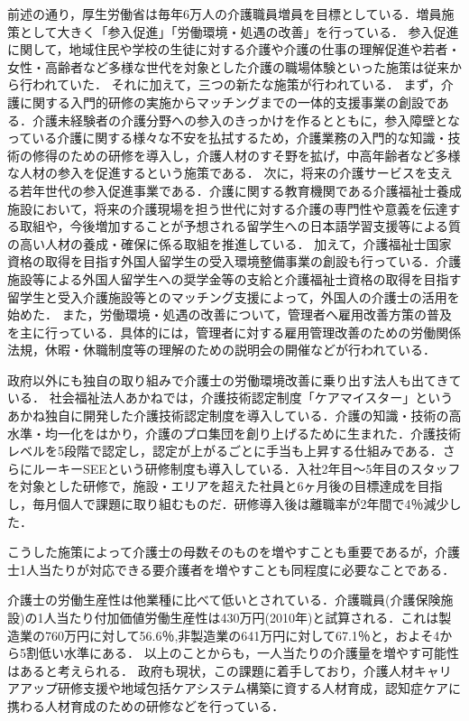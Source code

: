 前述の通り，厚生労働省は毎年6万人の介護職員増員を目標としている．増員施策として大きく「参入促進」「労働環境・処遇の改善」を行っている．
参入促進に関して，地域住民や学校の生徒に対する介護や介護の仕事の理解促進や若者・女性・高齢者など多様な世代を対象とした介護の職場体験といった施策は従来から行われていた．
それに加えて，三つの新たな施策が行われている．
まず，介護に関する入門的研修の実施からマッチングまでの一体的支援事業の創設である．介護未経験者の介護分野への参入のきっかけを作るとともに，参入障壁となっている介護に関する様々な不安を払拭するため，介護業務の入門的な知識・技術の修得のための研修を導入し，介護人材のすそ野を拡げ，中高年齢者など多様な人材の参入を促進するという施策である．
次に，将来の介護サービスを支える若年世代の参入促進事業である．介護に関する教育機関である介護福祉士養成施設において，将来の介護現場を担う世代に対する介護の専門性や意義を伝達する取組や，今後増加することが予想される留学生への日本語学習支援等による質の高い人材の養成・確保に係る取組を推進している．
加えて，介護福祉士国家資格の取得を目指す外国人留学生の受入環境整備事業の創設も行っている．介護施設等による外国人留学生への奨学金等の支給と介護福祉士資格の取得を目指す留学生と受入介護施設等とのマッチング支援によって，外国人の介護士の活用を始めた．
また，労働環境・処遇の改善について，管理者へ雇用改善方策の普及を主に行っている．具体的には，管理者に対する雇用管理改善のための労働関係法規，休暇・休職制度等の理解のための説明会の開催などが行われている．

政府以外にも独自の取り組みで介護士の労働環境改善に乗り出す法人も出てきている．
社会福祉法人あかねでは，介護技術認定制度「ケアマイスター」というあかね独自に開発した介護技術認定制度を導入している．介護の知識・技術の高水準・均一化をはかり，介護のプロ集団を創り上げるために生まれた．介護技術レベルを5段階で認定し，認定が上がるごとに手当も上昇する仕組みである．さらにルーキーSEEという研修制度も導入している．入社2年目～5年目のスタッフを対象とした研修で，施設・エリアを超えた社員と6ヶ月後の目標達成を目指し，毎月個人で課題に取り組むものだ．研修導入後は離職率が2年間で4％減少した．

こうした施策によって介護士の母数そのものを増やすことも重要であるが，介護士1人当たりが対応できる要介護者を増やすことも同程度に必要なことである．

介護士の労働生産性は他業種に比べて低いとされている．介護職員(介護保険施設)の1人当たり付加価値労働生産性は430万円(2010年)と試算される．これは製造業の760万円に対して56.6％,非製造業の641万円に対して67.1％と，およそ4から5割低い水準にある．
以上のことからも，一人当たりの介護量を増やす可能性はあると考えられる．
政府も現状，この課題に着手しており，介護人材キャリアアップ研修支援や地域包括ケアシステム構築に資する人材育成，認知症ケアに携わる人材育成のための研修などを行っている．

